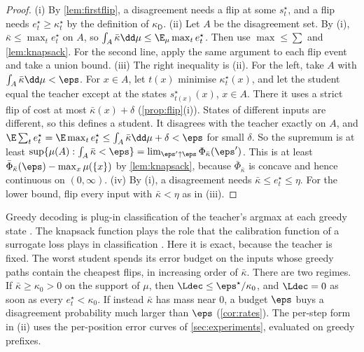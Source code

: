 \begin{proof}
(i) By \cref{lem:firstflip}, a disagreement needs a flip at some $s^\star_t$, and a flip needs
$e^\star_t\ge\kappa^\star_t$ by the definition of $\kappa_{\mathsf D}$.
(ii) Let $A$ be the disagreement set. By (i), $\bar\kappa\le\max_te^\star_t$ on $A$, so
$\int_A\bar\kappa\dd\mu\le\E_\mu\max_te^\star_t$. Then use $\max\le\sum$ and \cref{lem:knapsack}. For the second line,
apply the same argument to each flip event and take a union bound.
(iii) The right inequality is (ii). For the left, take $A$ with $\int_A\bar\kappa\dd\mu<\eps$. For $x\in A$, let
$t(x)$ minimise $\kappa^\star_t(x)$, and let the student equal the teacher except at the states
$s^\star_{t(x)}(x)$, $x\in A$. There it uses a strict flip of cost at most $\bar\kappa(x)+\delta$
(\cref{prop:flip}(i)). States of different inputs are different, so this defines a student. It disagrees
with the teacher exactly on $A$, and $\E\sum_te^\star_t=\E\max_te^\star_t\le\int_A\bar\kappa\dd\mu+\delta<\eps$ for small
$\delta$. So the supremum is at least $\sup\{\mu(A):\int_A\bar\kappa<\eps\}=\lim_{\eps'\uparrow\eps}\Phi_{\bar\kappa}(\eps')$.
This is at least $\bar\Phi_{\bar\kappa}(\eps)-\max_x\mu(\{x\})$ by \cref{lem:knapsack}, because $\bar\Phi_{\bar\kappa}$ is
concave and hence continuous on $(0,\infty)$.
(iv) By (i), a disagreement needs $\bar\kappa\le e^\star_t\le\eta$. For the lower bound, flip every input with
$\bar\kappa<\eta$ as in (iii).
\end{proof}

\begin{remark}\label{rem:greedy}
Greedy decoding is plug-in classification of the teacher's argmax at each greedy state
\citep{audibert2007fast}. The knapsack
function plays the role that the calibration function of a surrogate loss plays in classification
\citep{bartlett2006convexity}. Here it is exact, because the teacher is fixed. The worst student spends
its error budget on the inputs whose greedy paths contain the cheapest flips, in increasing order of
$\bar\kappa$. There are two regimes. If $\bar\kappa\ge\kappa_0>0$ on the support of $\mu$, then $\Ldec\le\eps^\star/\kappa_0$,
and $\Ldec=0$ as soon as every $e^\star_t<\kappa_0$. If instead $\bar\kappa$ has mass near $0$, a budget $\eps$ buys a
disagreement probability much larger than $\eps$ (\cref{cor:rates}). The per-step form in (ii) uses the
per-position error curves of \cref{sec:experiments}, evaluated on greedy prefixes.
\end{remark}


